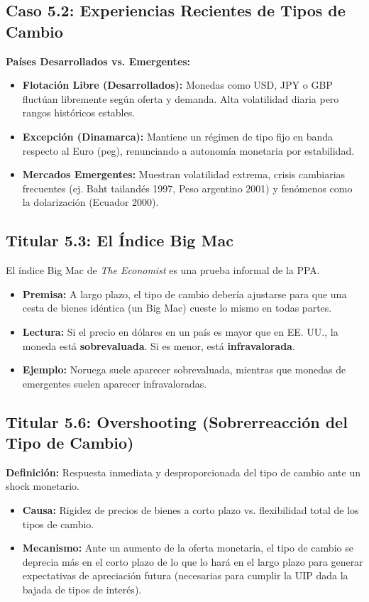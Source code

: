 \documentclass[a4paper,12pt]{report}
\theoremstyle{ejerciciostyle}
\newcommand{\nota}[2]{
    \begin{tcolorbox}[colframe=corporateblue, colback=corporatebg, title=\textbf{#1}]
        #2
    \end{tcolorbox}
}
\begin{document}
\subsection{Caso 5.2: Experiencias Recientes de Tipos de Cambio}
\textbf{Países Desarrollados vs. Emergentes:}
\begin{itemize}
    \item \textbf{Flotación Libre (Desarrollados):} Monedas como USD, JPY o GBP fluctúan libremente según oferta y demanda. Alta volatilidad diaria pero rangos históricos estables.
    \item \textbf{Excepción (Dinamarca):} Mantiene un régimen de tipo fijo en banda respecto al Euro (peg), renunciando a autonomía monetaria por estabilidad.
    \item \textbf{Mercados Emergentes:} Muestran volatilidad extrema, crisis cambiarias frecuentes (ej. Baht tailandés 1997, Peso argentino 2001) y fenómenos como la dolarización (Ecuador 2000).
\end{itemize}

\subsection{Titular 5.3: El Índice Big Mac}
\nota{Paridad del Poder Adquisitivo (PPA)}{
El índice Big Mac de \textit{The Economist} es una prueba informal de la PPA.
\begin{itemize}
    \item \textbf{Premisa:} A largo plazo, el tipo de cambio debería ajustarse para que una cesta de bienes idéntica (un Big Mac) cueste lo mismo en todas partes.
    \item \textbf{Lectura:} Si el precio en dólares en un país es mayor que en EE. UU., la moneda está \textbf{sobrevaluada}. Si es menor, está \textbf{infravalorada}.
    \item \textbf{Ejemplo:} Noruega suele aparecer sobrevaluada, mientras que monedas de emergentes suelen aparecer infravaloradas.
\end{itemize}
}

\subsection{Titular 5.6: Overshooting (Sobrerreacción del Tipo de Cambio)}
\textbf{Definición:} Respuesta inmediata y desproporcionada del tipo de cambio ante un shock monetario.
\begin{itemize}
    \item \textbf{Causa:} Rigidez de precios de bienes a corto plazo vs. flexibilidad total de los tipos de cambio.
    \item \textbf{Mecanismo:} Ante un aumento de la oferta monetaria, el tipo de cambio se deprecia más en el corto plazo de lo que lo hará en el largo plazo para generar expectativas de apreciación futura (necesarias para cumplir la UIP dada la bajada de tipos de interés).
\end{itemize}
\end{document}
